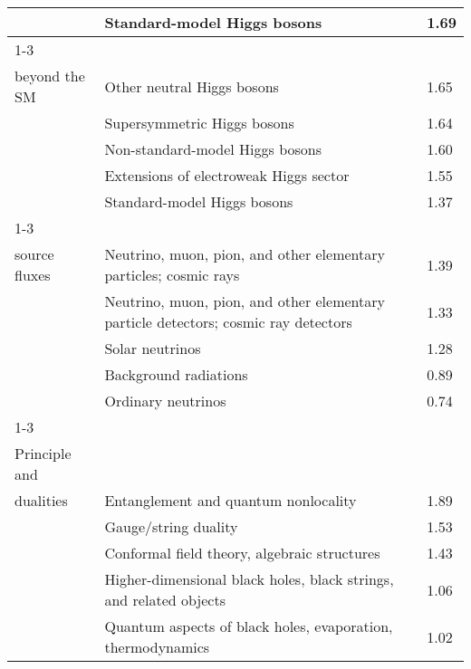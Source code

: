 \begin{longtable}[H]{p{}|p{}|p{}}
                                        & Standard-model Higgs bosons &  1.69 \\
\cline{1-3}
\multirow{5}{*}{\begin{tabular}{l}Higgs sector\\ beyond the SM\end{tabular}} & Other neutral Higgs bosons &  1.65 \\
                                        & Supersymmetric Higgs bosons &  1.64 \\
                                        & Non-standard-model Higgs bosons &  1.60 \\
                                        & Extensions of electroweak Higgs sector &  1.55 \\
                                        & Standard-model Higgs bosons &  1.37 \\
\cline{1-3}
\multirow{5}{*}{\begin{tabular}{l}High-energy\\ source fluxes\end{tabular}} & Neutrino, muon, pion, and other elementary particles; cosmic rays &  1.39 \\
                                        & Neutrino, muon, pion, and other elementary particle detectors; cosmic ray detectors &  1.33 \\
                                        & Solar neutrinos &  1.28 \\
                                        & Background radiations &  0.89 \\
                                        & Ordinary neutrinos &  0.74 \\
\cline{1-3}
\multirow{5}{*}{\begin{tabular}{l}Holographic\\ Principle and\\ dualities\end{tabular}} & Entanglement and quantum nonlocality &  1.89 \\
                                        & Gauge/string duality &  1.53 \\
                                        & Conformal field theory, algebraic structures &  1.43 \\
                                        & Higher-dimensional black holes, black strings, and related objects &  1.06 \\
                                        & Quantum aspects of black holes, evaporation, thermodynamics &  1.02 \\

\end{longtable}
